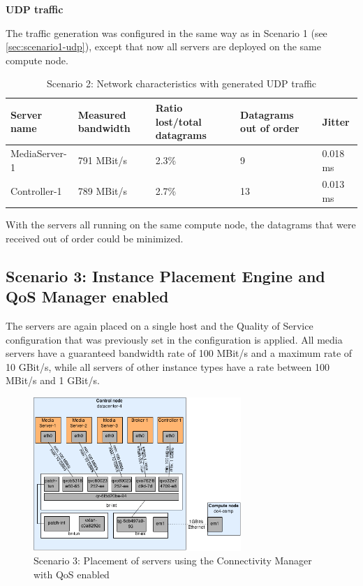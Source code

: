 \textbf{UDP traffic} \label{sec:scenario2-udp}

The traffic generation was configured in the same way as in Scenario 1 (see \ref{sec:scenario1-udp}), except that now all servers are deployed on the same compute node.

\begin{table}[H]
\centering

\begin{tabularx}{\textwidth}{ |X|X|X|X|X| }
\hline Server name & Measured bandwidth & Ratio lost/total datagrams & Datagrams out of order & Jitter \\ 
\hline MediaServer-1 & 791 MBit/s & 2.3\% & 9 & 0.018 ms\\ 
\hline Controller-1 & 789 MBit/s & 2.7\% & 13 & 0.013 ms \\ 
\hline 
\end{tabularx}

\caption{Scenario 2: Network characteristics with generated UDP traffic}
\end{table}

With the servers all running on the same compute node, the datagrams that were received out of order could be minimized.
\newpage
\subsection{Scenario 3: Instance Placement Engine and QoS Manager enabled}

The servers are again placed on a single host and the Quality of Service configuration that was previously set in the configuration is applied. All media servers have a guaranteed bandwidth rate of 100 MBit/s and a maximum rate of 10 GBit/s, while all servers of other instance types have a rate between 100 MBit/s and 1 GBit/s.

\begin{figure}[H]
\centering

\includegraphics[width=0.7\textwidth]{images/evaluation/testbed_scenario3}

\caption{Scenario 3: Placement of servers using the Connectivity Manager with QoS enabled}
\end{figure}

